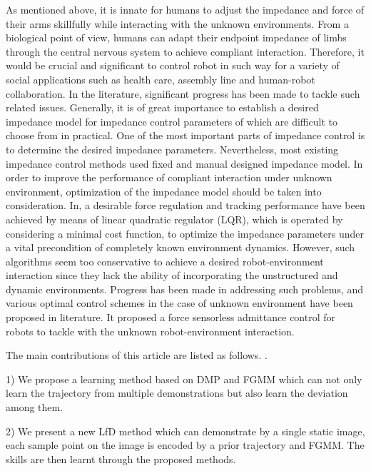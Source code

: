 \documentclass[journal]{IEEEtran}
\begin{document}
As mentioned above, it is innate for humans to adjust the impedance and force of their arms skillfully while interacting with the unknown environments. From a biological point of view, humans can adapt their endpoint impedance of limbs through the central nervous system to achieve compliant interaction. Therefore, it would be crucial and significant to control robot in such way for a variety of social applications such as health care, assembly line and human-robot collaboration. In the literature, significant progress has been made to tackle such related issues. Generally, it is of great importance to establish a desired impedance model for impedance control parameters of which are difficult to choose from in practical. One of the most important parts of impedance control is to determine the desired impedance parameters. Nevertheless, most existing impedance control methods used fixed and manual designed impedance model. In order to improve the performance of compliant interaction under unknown environment, optimization of the impedance model should be taken into consideration. In, a desirable force regulation and tracking performance have been achieved by means of linear quadratic regulator (LQR), which is operated by considering a minimal cost function, to optimize the impedance parameters under a vital precondition of completely known environment dynamics. However, such algorithms seem too conservative to achieve a desired robot-environment interaction since they lack the ability of incorporating the unstructured and dynamic environments. Progress has been made in addressing such problems, and various optimal control schemes in the case of unknown environment have been proposed in literature. It proposed a force sensorless admittance control for robots to tackle with the unknown robot-environment interaction.

The main contributions of this article are listed as follows. \cite{Ju2012}.

1) We propose a learning method based on DMP and FGMM which can not only learn the trajectory from multiple demonstrations but also learn the deviation among them.

2) We present a new LfD method which can demonstrate by a single static image, each sample point on the image is encoded by a prior trajectory and FGMM. The skills are then learnt through the proposed methods.
\end{document}
